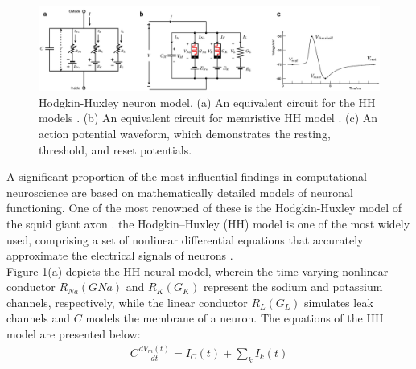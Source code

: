 

\begin{figure}[htbp!] 
    \centering    
    \includegraphics[width=1\textwidth]{Chapter2/Figs/c.png}
    \caption[Hodgkin-Huxley neuron model.]{Hodgkin-Huxley neuron model. (a) An equivalent circuit for the HH models \cite{hodgkin1952quantitative}. (b) An equivalent circuit for memristive HH model \cite{chua2012hodgkin}. (c) An action potential waveform, which demonstrates the resting, threshold, and reset potentials. }
    \label{fig:2c}
\end{figure}

\noindent A significant proportion of the most influential findings in computational neuroscience are based on mathematically detailed models of neuronal functioning. One of the most renowned of these is the Hodgkin-Huxley model of the squid giant axon \cite{hodgkin1952quantitative}. the Hodgkin–Huxley (HH) model is one of the most widely used, comprising a set of nonlinear differential equations that accurately approximate the electrical signals of neurons \cite{chua2012hodgkin}. \\

\noindent Figure \ref{fig:2c}(a) depicts the HH neural model, wherein the time-varying nonlinear conductor $R_{Na}(GNa)$ and $R_K(G_K)$ represent the sodium and potassium channels, respectively, while the linear conductor $R_L(G_L)$ simulates leak channels and $C$ models the membrane of a neuron. The equations of the HH model are presented below: 
\begin{align}
    C \frac{dV_m(t)}{dt} = I_C(t) + \sum_{k}^{}I_k(t) \label{eq:2.1} 
\end{align}


